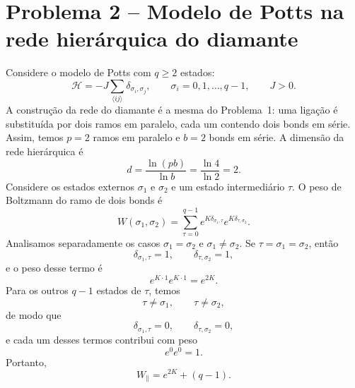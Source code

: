 \documentclass[12pt,a4paper]{article}
\begin{document}
\section*{Problema 2 -- Modelo de Potts na rede hierárquica do diamante}
%
Considere o modelo de Potts com \(q\ge2\) estados:
%
\begin{equation}
    \mathcal H
    =
    -J\sum_{\langle ij\rangle}
    \delta_{\sigma_i,\sigma_j},
    \qquad
    \sigma_i=0,1,\ldots,q-1,
    \qquad
    J>0.
    \label{eq:H_potts}
\end{equation}
%
A construção da rede do diamante é a mesma do Problema~1: uma ligação
é substituída por dois ramos em paralelo, cada um contendo dois bonds
em série. Assim, temos \(p=2\) ramos em paralelo e \(b=2\) bonds em
série. A dimensão da rede hierárquica é
%
\begin{equation}
    d=\frac{\ln(pb)}{\ln b}
    =\frac{\ln 4}{\ln 2}=2.
\end{equation}
% 
Considere os estados externos \(\sigma_1\) e \(\sigma_2\) e um estado intermediário \(\tau\). O peso de Boltzmann do ramo de dois bonds é
%
\begin{equation}
    W(\sigma_1,\sigma_2)
    =
    \sum_{\tau=0}^{q-1}
    e^{K\delta_{\sigma_1,\tau}}
    e^{K\delta_{\tau,\sigma_2}}.
    \label{eq:Wpotts}
\end{equation}
%
Analisamos separadamente os casos \(\sigma_1=\sigma_2\) e
\(\sigma_1\neq\sigma_2\). Se \(\tau=\sigma_1=\sigma_2\), então
%
\begin{equation}
    \delta_{\sigma_1,\tau}=1,
    \qquad
    \delta_{\tau,\sigma_2}=1,
\end{equation}
%
e o peso desse termo é
%
\begin{equation}
    e^{K\cdot1}e^{K\cdot1}=e^{2K}.
\end{equation}
%
Para os outros \(q-1\) estados de \(\tau\), temos
%
\begin{equation}
    \tau\neq\sigma_1,
    \qquad
    \tau\neq\sigma_2,
\end{equation}
%
de modo que
%
\begin{equation}
    \delta_{\sigma_1,\tau}=0,
    \qquad
    \delta_{\tau,\sigma_2}=0,
\end{equation}
%
e cada um desses termos contribui com peso
%
\begin{equation}
    e^{0}e^{0}=1.
\end{equation}
%
Portanto,
%
\begin{equation}
    W_{\parallel}
    =
    e^{2K}+(q-1).
    \label{eq:Wpar_potts}
\end{equation}
\end{document}
